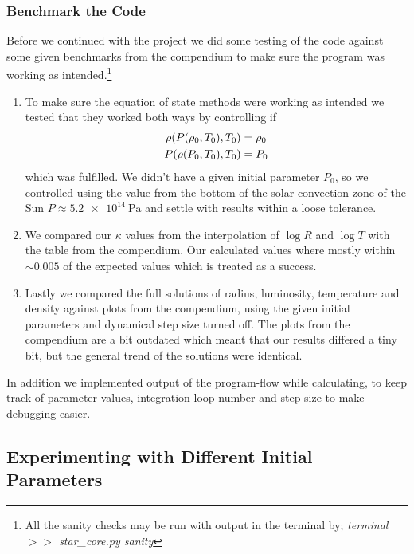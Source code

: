 \documentclass[11pt,a4paper,twocolumn,titlepage]{article}
\begin{document}
\subsubsection{Benchmark the Code} \label{subsubsec:Method/Benchmark}
Before we continued with the project we did some testing of the code against some given benchmarks from the compendium to make sure the program was working as intended.\footnote{All the sanity checks may be run with output in the terminal by;  \textit{terminal $>>$ {star\_core.py} sanity}}
\begin{enumerate}
\item To make sure the equation of state methods were working as intended we tested that they worked both ways by controlling if 
\begin{align*}
\rho\qty(P\qty(\rho_0,T_0),T_0) &= \rho_0
\\
P\qty(\rho\qty(P_0,T_0),T_0) &= P_0
\end{align*}
which was fulfilled. We didn't have a given initial parameter $P_0$, so we controlled using the value from the bottom of the solar convection zone of the Sun ${P \approx \SI{5.2e14}{\pascal}}$ and settle with results within a loose tolerance.

\item We compared our $\kappa$ values from the interpolation of $\log{R}$ and $\log{T}$ with the table from the compendium. Our calculated values where mostly within $\sim 0.005$ of the expected values which is treated as a success.

\item Lastly we compared the full solutions of radius, luminosity, temperature and density against plots from the compendium, using the given initial parameters and dynamical step size turned off. The plots from the compendium are a bit outdated which meant that our results differed a tiny bit, but the general trend of the solutions were identical.
\end{enumerate}
In addition we implemented output of the program-flow while calculating, to keep track of parameter values, integration loop number and step size to make debugging easier.

\subsection{Experimenting with Different Initial Parameters}
\label{subsub:Method/Experimenting_initial_params}
\end{document}

